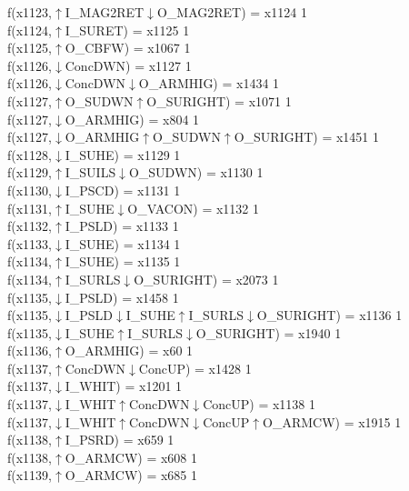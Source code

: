 f(x1123,$\uparrow$I\_MAG2RET$\downarrow$O\_MAG2RET) = x1124 {1} \\
f(x1124,$\uparrow$I\_SURET) = x1125 {1} \\
f(x1125,$\uparrow$O\_CBFW) = x1067 {1} \\
f(x1126,$\downarrow$ConcDWN) = x1127 {1} \\
f(x1126,$\downarrow$ConcDWN$\downarrow$O\_ARMHIG) = x1434 {1} \\
f(x1127,$\uparrow$O\_SUDWN$\uparrow$O\_SURIGHT) = x1071 {1} \\
f(x1127,$\downarrow$O\_ARMHIG) = x804 {1} \\
f(x1127,$\downarrow$O\_ARMHIG$\uparrow$O\_SUDWN$\uparrow$O\_SURIGHT) = x1451 {1} \\
f(x1128,$\downarrow$I\_SUHE) = x1129 {1} \\
f(x1129,$\uparrow$I\_SUILS$\downarrow$O\_SUDWN) = x1130 {1} \\
f(x1130,$\downarrow$I\_PSCD) = x1131 {1} \\
f(x1131,$\uparrow$I\_SUHE$\downarrow$O\_VACON) = x1132 {1} \\
f(x1132,$\uparrow$I\_PSLD) = x1133 {1} \\
f(x1133,$\downarrow$I\_SUHE) = x1134 {1} \\
f(x1134,$\uparrow$I\_SUHE) = x1135 {1} \\
f(x1134,$\uparrow$I\_SURLS$\downarrow$O\_SURIGHT) = x2073 {1} \\
f(x1135,$\downarrow$I\_PSLD) = x1458 {1} \\
f(x1135,$\downarrow$I\_PSLD$\downarrow$I\_SUHE$\uparrow$I\_SURLS$\downarrow$O\_SURIGHT) = x1136 {1} \\
f(x1135,$\downarrow$I\_SUHE$\uparrow$I\_SURLS$\downarrow$O\_SURIGHT) = x1940 {1} \\
f(x1136,$\uparrow$O\_ARMHIG) = x60 {1} \\
f(x1137,$\uparrow$ConcDWN$\downarrow$ConcUP) = x1428 {1} \\
f(x1137,$\downarrow$I\_WHIT) = x1201 {1} \\
f(x1137,$\downarrow$I\_WHIT$\uparrow$ConcDWN$\downarrow$ConcUP) = x1138 {1} \\
f(x1137,$\downarrow$I\_WHIT$\uparrow$ConcDWN$\downarrow$ConcUP$\uparrow$O\_ARMCW) = x1915 {1} \\
f(x1138,$\uparrow$I\_PSRD) = x659 {1} \\
f(x1138,$\uparrow$O\_ARMCW) = x608 {1} \\
f(x1139,$\uparrow$O\_ARMCW) = x685 {1} \\
